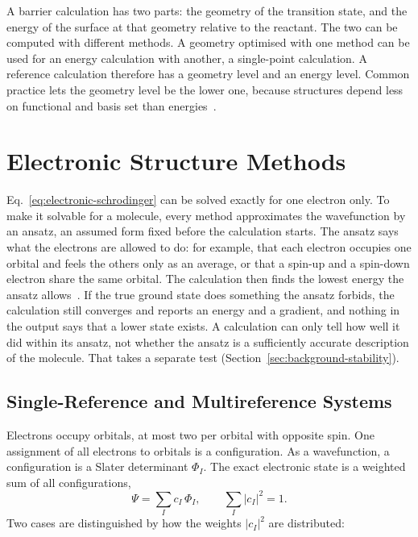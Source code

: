 A barrier calculation has two parts: the geometry of the transition state,
and the energy of the surface at that geometry relative to the reactant. The
two can be computed with different methods. A geometry optimised with one
method can be used for an energy calculation with another, a single-point
calculation. A reference calculation therefore has a geometry level and an
energy level. Common practice lets the geometry level be the lower one,
because structures depend less on functional and basis set than
energies~\cite{bursch2022}.

\section{Electronic Structure Methods}
\label{sec:background-electronic}

Eq.~\eqref{eq:electronic-schrodinger} can be solved exactly for one
electron only. To make it solvable for a molecule, every method
approximates the wavefunction by an ansatz, an assumed form fixed
before the calculation starts. The ansatz says what the electrons are
allowed to do: for example, that each electron occupies one orbital
and feels the others only as an average, or that a spin-up and a
spin-down electron share the same orbital. The calculation then finds
the lowest energy the ansatz allows~\cite{szabo1996}. If the true
ground state does something the ansatz forbids, the calculation still
converges and reports an energy and a gradient, and nothing in the
output says that a lower state exists. A calculation can only tell how
well it did within its ansatz, not whether the ansatz is a
sufficiently accurate description of the molecule. That takes a
separate test (Section~\ref{sec:background-stability}).

\subsection{Single-Reference and Multireference Systems}
\label{sec:sr-vs-mr}

Electrons occupy orbitals, at most two per orbital with opposite spin. One
assignment of all electrons to orbitals is a configuration. As a
wavefunction, a configuration is a Slater determinant $\Phi_I$. The exact
electronic state is a weighted sum of all configurations,
%
\begin{equation}
  \Psi = \sum_I c_I \, \Phi_I , \qquad \sum_I |c_I|^2 = 1 .
  \label{eq:ci-expansion}
\end{equation}
%
Two cases are distinguished by how the weights $|c_I|^2$ are distributed:

